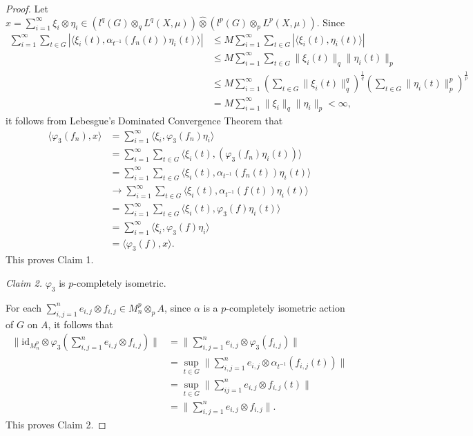 \documentclass[reqno,11pt]{amsart}
\theoremstyle{plain}
\theoremstyle{definition}
\theoremstyle{remark}
\newcommand{\la}{\langle}
\newcommand{\ra}{\rangle}
\begin{document}
\begin{proof}
Let $x=\sum_{i=1}^\infty \xi_i\otimes\eta_i\in (l^q(G)\otimes_qL^q(X,\mu))\widehat{\otimes}(l^p(G)\otimes_pL^p(X,\mu))$.
Since $$\begin{aligned} \sum_{i=1}^\infty\sum_{t\in G}|\la\xi_i(t),\alpha_{t^{-1}}(f_n(t))\eta_i(t)\ra|
 &\leq M \sum_{i=1}^\infty\sum_{t\in G}|\la\xi_i(t),\eta_i(t)\ra|\\
 &\leq M\sum_{i=1}^\infty \sum_{t\in G}\|\xi_i(t)\|_q\|\eta_i(t)\|_p\\
 &\leq M\sum_{i=1}^\infty (\sum_{t\in G}\|\xi_i(t)\|_{q}^q)^{\frac{1}{q}}(\sum_{t\in G}\|\eta_i(t)\|_{p}^p)^{\frac{1}{p}}\\
 &=M\sum_{i=1}^\infty \|\xi_i\|_q\|\eta_i\|_p<\infty, \end{aligned}$$
it follows from  Lebesgue's Dominated Convergence Theorem that
$$\begin{aligned} \la \varphi_3(f_n),x\ra
 &=\sum_{i=1}^\infty \la \xi_i,\varphi_3(f_n)\eta_i\ra \\
 &=\sum_{i=1}^\infty \sum_{t\in G}\la\xi_i(t),(\varphi_3(f_n)\eta_i(t))\ra\\
 &=\sum_{i=1}^\infty \sum_{t\in G}\la \xi_i(t),\alpha_{t^{-1}}(f_n(t))\eta_i(t)\ra \\
 &\rightarrow \sum_{i=1}^\infty \sum_{t\in G}\la\xi_i(t),\alpha_{t^{-1}}(f(t))\eta_i(t)\ra\\
 &=\sum_{i=1}^\infty \sum_{t\in G}\la\xi_i(t),\varphi_3(f)\eta_i(t)\ra\\
 &=\sum_{i=1}^\infty \la \xi_i,\varphi_3(f)\eta_i\ra\\
 &=\la \varphi_3(f),x\ra. \end{aligned}$$
This proves Claim 1.

{\it Claim 2.} $\varphi_3$ is $p$-completely isometric.

For each $\sum_{i,j=1}^n e_{i,j}\otimes f_{i,j}\in M_n^p\otimes_p A$, since $\alpha$ is a $p$-completely isometric action of $G$ on $A$, it follows that
$$\begin{aligned}\| \mathrm{id}_{M_n^p}\otimes\varphi_3(\sum_{i,j=1}^n e_{i,j}\otimes f_{i,j})\|
 &=\|\sum_{i,j=1}^n e_{i,j}\otimes \varphi_3(f_{i,j})\|\\
 &=\sup_{t\in G}\|\sum_{i,j=1}^ne_{i,j}\otimes \alpha_{t^{-1}}(f_{i,j}(t))\|\\
 &=\sup_{t\in G}\|\sum_{ij=1}^ne_{i,j}\otimes f_{i,j}(t)\|\\
 &=\|\sum_{i,j=1}^n e_{i,j}\otimes f_{i,j}\|. \end{aligned}$$
This proves Claim 2.




\end{proof}
\end{document}
